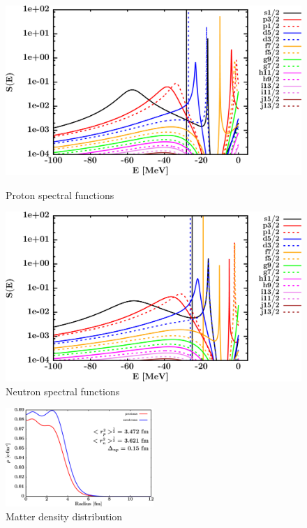 \begin{figure}[H]
    \centering
    \begin{minipage}{0.45\textwidth}
        \centering
        \includegraphics[width=1.0\textwidth]{figures/ca48_protonSpectralFunctions.png}
        \caption{Proton spectral functions}
        \label{DOMFitData_ca48_proton_spectralFunctions}
    \end{minipage}\hfill
    \begin{minipage}{0.45\textwidth}
        \centering
        \includegraphics[width=1.0\textwidth]{figures/ca48_neutronSpectralFunctions.png}
        \caption{Neutron spectral functions}
        \label{DOMFitData_ca48_neutron_spectralFunctions}
    \end{minipage}
\end{figure}

\begin{figure}[H]
    \centering
    \includegraphics[width = 0.5\textwidth]{figures/ca48_matterDensity.png}
    \caption{Matter density distribution}
    \label{DOMFitData_ca48_matterDensity}
\end{figure}

